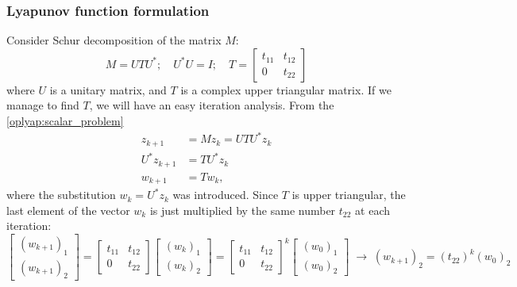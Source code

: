 \documentclass[a4paper,11pt]{article}
\begin{document}
\subsubsection{Lyapunov function formulation}
Consider Schur decomposition of the matrix $M:$
\begin{equation}
 \label{oplyap:eq:schur}
 M = U T U^*; \quad U^*U = I; \quad T = \begin{bmatrix} 
 t_{11} & t_{12} \\
 0 & t_{22}
 \end{bmatrix}
\end{equation}
where $U$ is a unitary matrix, and $T$ is a complex upper triangular matrix. If we manage to find $T$, we will have an easy iteration analysis. From the \eqref{oplyap:scalar_problem}
\begin{equation}
 \label{oplyap:eq:iteration_analysis}
 \begin{split}
 z_{k+1} &= M z_k = U T U^* z_k \\
 U^* z_{k+1}&= T U^* z_k \\
 w_{k+1} &= T w_k,
 \end{split}
\end{equation}
where the substitution $w_k = U^* z_k$ was introduced.
Since $T$ is upper triangular, the last element of the vector $w_k$ is just multiplied by the same number $t_{22}$ at each iteration:
\begin{equation}
 \label{oplyap:eq:upper_triangle_evolution}
 \begin{bmatrix} 
 (w_{k+1})_1 \\
 (w_{k+1})_2
 \end{bmatrix} = \begin{bmatrix} 
 t_{11} & t_{12} \\
 0 & t_{22}
 \end{bmatrix} \begin{bmatrix} 
 (w_{k})_1 \\
 (w_{k})_2
 \end{bmatrix} = \begin{bmatrix} 
 t_{11} & t_{12} \\
 0 & t_{22}
 \end{bmatrix}^k \begin{bmatrix} 
 (w_{0})_1 \\
 (w_{0})_2
 \end{bmatrix} \; \rightarrow \; (w_{k+1})_2 = (t_{22})^k ( w_{0})_2
\end{equation}
\end{document}
